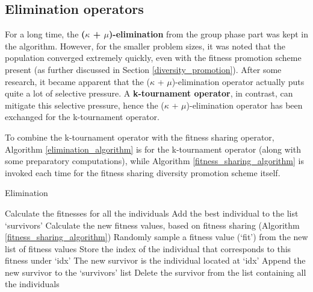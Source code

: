 \documentclass[a4paper,10pt]{article}
\newcommand{\ReplaceMe}[1]{{\color{blue}#1}}
\begin{document}
\subsection{Elimination operators}
\label{elimination}
For a long time, the \textbf{($\kappa$ + $\mu$)-elimination} from the group phase part was kept in the algorithm. However, for the smaller problem sizes, it was noted that the population converged extremely quickly, even with the fitness promotion scheme present (as further discussed in Section \ref{diversity_promotion}). After some research, it became apparent that the ($\kappa$ + $\mu$)-elimination operator actually puts quite a lot of selective pressure. A \textbf{k-tournament operator}, in contrast, can mitigate this selective pressure, hence the ($\kappa$ + $\mu$)-elimination operator has been exchanged for the k-tournament operator.

To combine the k-tournament operator with the fitness sharing operator, Algorithm \ref{elimination_algorithm} is for the k-tournament operator (along with some preparatory computations), while Algorithm \ref{fitness_sharing_algorithm} is invoked each time for the fitness sharing diversity promotion scheme itself.

\begin{algorithm}
\caption{Elimination \cite{eiben_smith}}\label{elimination_algorithm}
\begin{algorithmic}
\State Calculate the fitnesses for all the individuals
\State Add the best individual to the list `survivors'
\State Calculate the new fitness values, based on fitness sharing (Algorithm \ref{fitness_sharing_algorithm})
\State Randomly sample a fitness value (`fit') from the new list of fitness values
\State Store the index of the individual that corresponds to this fitness under `idx'
\EndIf
\EndFor
\State The new survivor is the individual located at `idx'
\State Append the new survivor to the `survivors' list
\State Delete the survivor from the list containing all the individuals
\EndFor
\end{algorithmic}
\end{algorithm}
\end{document}
